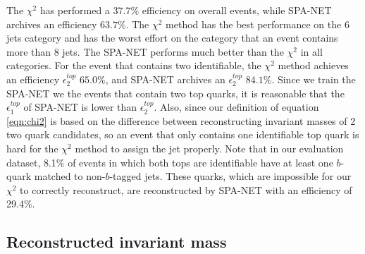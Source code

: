 The $\chi^{2}$ has performed a $37.7\%$ efficiency on overall events, while SPA-NET archives an efficiency $63.7\%$. The $\chi^{2}$ method has the best performance on the 6 jets category and has the worst effort on the category that an event contains more than 8 jets. The SPA-NET performs much better than the $\chi^{2}$ in all categories. For the event that contains two identifiable, the $\chi^{2}$ method achieves an efficiency $\epsilon^{top}_{2}$ $65.0\%$, and SPA-NET archives an $\epsilon^{top}_{2}$ $84.1\%$. Since we train the SPA-NET we the events that contain two top quarks, it is reasonable that the $\epsilon^{top}_{1}$ of SPA-NET is lower than $\epsilon^{top}_{2}$. Also, since our definition of equation \ref{eqn:chi2} is based on the difference between reconstructing invariant masses of 2 two quark candidates, so an event that only contains one identifiable top quark is hard for the $\chi^{2}$ method to assign the jet properly. Note that in our evaluation dataset, 8.1\% of events in which both tops are identifiable have at least one $b$-quark matched to non-$b$-tagged jets. These quarks, which are impossible for our $\chi^2$ to correctly reconstruct, are reconstructed by SPA-NET with an efficiency of 29.4\%. 

\subsection{Reconstructed invariant mass }\label{subsec:reco inv mass }

